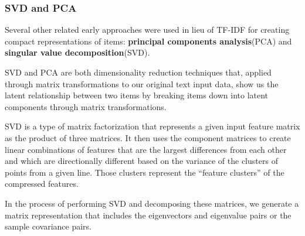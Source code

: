 \documentclass[11pt, table]{diazessay} %
\begin{document}
\begin{sloppypar}
\subsubsection{SVD and PCA}

Several other related early approaches were used in lieu of TF-IDF for creating compact representations of items: \textbf{principal components analysis}(PCA) and \textbf{singular value decomposition}(SVD).  

SVD and PCA are both dimensionality reduction techniques that, applied through matrix transformations to our original text input data, show us the latent relationship between two items by breaking items down into latent components through matrix transformations.   

SVD is a type of matrix factorization that represents a given input feature matrix as the product of three matrices.  It then uses the component matrices to create linear combinations of features that are the largest differences from each other and which are directionally different based on the variance of the clusters of points from a given line.   Those clusters represent the “feature clusters” of the compressed features.  

In the process of performing SVD and decomposing these matrices, we generate a matrix representation that includes the eigenvectors and eigenvalue pairs or the sample covariance pairs.



\end{sloppypar}
\end{document}
